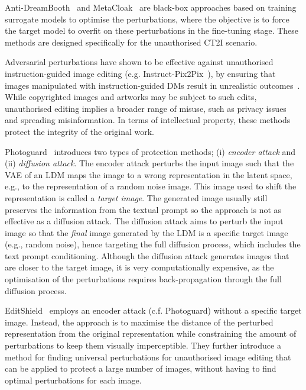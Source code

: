 \documentclass[conference,table]{IEEEtran}
\begin{document}
Anti-DreamBooth~\cite{van_le_anti-dreambooth_2023} and MetaCloak~\cite{liu_metacloak_2024} are black-box approaches based on training surrogate models to optimise the perturbations, where the objective is to force the target model to overfit on these perturbations in the fine-tuning stage. These methods are designed specifically for the unauthorised CT2I scenario.

Adversarial perturbations have shown to be effective against unauthorised instruction-guided image editing (e.g. Instruct-Pix2Pix~\cite{brooks_instructpix2pix_2023}),
by ensuring that images manipulated with instruction-guided DMs result in unrealistic outcomes~\cite{chen_editshield_2023,salman_raising_2023}. 
While copyrighted images and artworks may be subject to such edits, unauthorised editing implies a broader range of misuse, such as privacy issues and spreading misinformation.
In terms of intellectual property, these methods protect the integrity of the original work. 

Photoguard~\cite{salman_raising_2023} introduces two types of protection methods; (i) \textit{encoder attack} and (ii) \textit{diffusion attack}.
The encoder attack perturbs the input image such that the VAE of an LDM maps the image to a wrong representation in the latent space, e.g., to the representation of a random noise image. This image used to shift the representation is called a \textit{target image}. 
The generated image usually still preserves the information from the textual prompt so the approach is not as effective as a diffusion attack.
The diffusion attack aims to perturb the input image so that the \textit{final} image generated by the LDM is a specific target image (e.g., random noise), hence targeting the full diffusion process, which includes the text prompt conditioning.
Although the diffusion attack generates images that are closer to the target image, it is very computationally expensive, as the optimisation of the perturbations requires back-propagation through the full diffusion process.

EditShield~\cite{chen_editshield_2023} employs an encoder attack (c.f. Photoguard) without a specific target image. 
Instead, the approach is to maximise the distance of the perturbed representation from the original representation while constraining the amount of perturbations to keep them visually imperceptible. 
They further introduce a method for finding universal perturbations for unauthorised image editing that can be applied to protect a large number of images, without having to find optimal perturbations for each image. 
\end{document}
